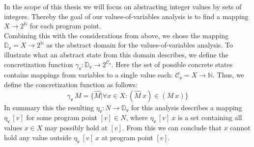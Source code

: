     In the scope of this thesis we will focus on abstracting integer values by sets of integers. Thereby the goal of our values-of-variables analysis is to find a mapping $X \rightarrow 2^\mathbb{N}$ for each program point.\\
    Combining this with the considerations from above, we chose the mapping $\mathbb{D}_\textsf{v} = X \rightarrow 2^\mathbb{N}$ as the abstract domain for the values-of-variables analysis. To illustrate what an abstract state from this domain describes, we define the concretization function $\gamma_\textsf{v}: \mathbb{D}_\textsf{v} \rightarrow 2^{\mathcal{C}_\textsf{v}}$. Here the set of possible concrete states contains mappings from variables to a single value each: $\mathcal{C}_\textsf{v} = X \rightarrow \mathbb{N}$. Thus, we define the concretization function as follows:
    \[ \gamma_\textsf{v}\ M = \{ \widehat{M} | \forall x \in X: (\widehat{M}\ x) \in (M\ x) \} \]
    In summary this the resulting $\eta_\textsf{v}: N \rightarrow \mathbb{D}_\textsf{v}$ for this analysis describes a mapping $\eta_\textsf{v}\ [v]$ for some program point $[v] \in N$, where $\eta_\textsf{v}\ [v]\ x$ is a set containing all values $x \in X$ may possibly hold at $[v]$. From this we can conclude that $x$ cannot hold any value outside $\eta_\textsf{v}\ [v]\ x$ at program point $[v]$. 

